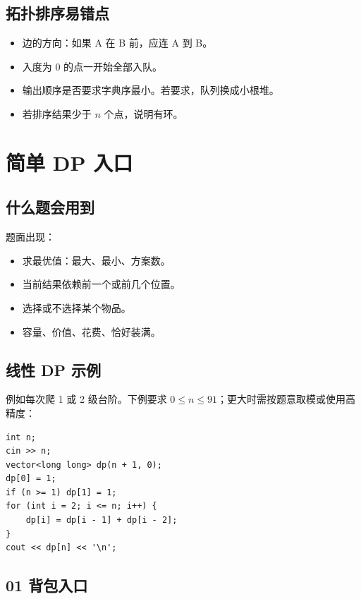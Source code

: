 \subsection{拓扑排序易错点}

\begin{itemize}
  \item 边的方向：如果 A 在 B 前，应连 A 到 B。
  \item 入度为 0 的点一开始全部入队。
  \item 输出顺序是否要求字典序最小。若要求，队列换成小根堆。
  \item 若排序结果少于 $n$ 个点，说明有环。
\end{itemize}

\section{简单 DP 入口}\label{sec:06-24}

\subsection{什么题会用到}

题面出现：

\begin{itemize}
  \item 求最优值：最大、最小、方案数。
  \item 当前结果依赖前一个或前几个位置。
  \item 选择或不选择某个物品。
  \item 容量、价值、花费、恰好装满。
\end{itemize}

\subsection{线性 DP 示例}

例如每次爬 1 或 2 级台阶。下例要求 $0\le n\le91$；更大时需按题意取模或使用高精度：

\begin{lstlisting}
int n;
cin >> n;
vector<long long> dp(n + 1, 0);
dp[0] = 1;
if (n >= 1) dp[1] = 1;
for (int i = 2; i <= n; i++) {
    dp[i] = dp[i - 1] + dp[i - 2];
}
cout << dp[n] << '\n';
\end{lstlisting}

\subsection{01 背包入口}


